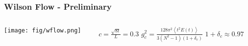 \begin{frame}
  \addtocounter{framenumber}{-1}
  \frametitle{Wilson Flow - Preliminary} 
  \begin{columns}
    \begin{column}{0.7\linewidth}
      \texttt{[image: fig/wflow.png]}
    \end{column}
    \begin{column}{0.3\textwidth}
      $c=\frac{\sqrt{8t}}{L}=0.3$\vspace{24pt}
      $g_c^2=\frac{128\pi^2\left<t^2E(t)\right>}{3(N^2-1)(1+\delta_c)}$\vspace{24pt}
      $1+\delta_c\approx0.97$
      \begin{column}{0.3\textwidth}
      \end{column}
    \end{column}
  \end{columns}
\end{frame}
